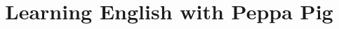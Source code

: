 \documentclass[a4paper]{article}
\begin{document}
\title{Learning English with Peppa Pig}

\author{}
\date{}


\maketitle
\begin{abstract}
\end{abstract}






%



\end{document}
